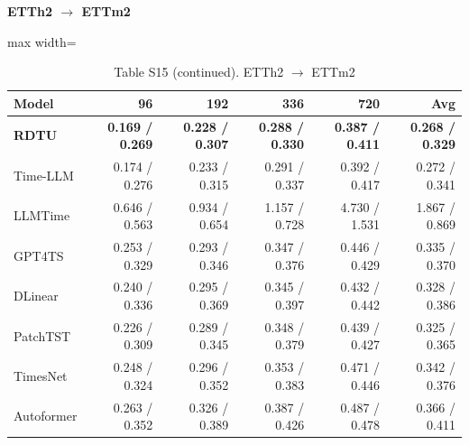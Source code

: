\begin{table}[H]\centering\small
\caption*{Table S15 (continued). ETTh2 $\to$ ETTm2}
\textbf{ETTh2 $\to$ ETTm2}\par\smallskip
\begin{adjustbox}{max width=\linewidth}\begin{tabular}{lrrrrr}\toprule
\textbf{Model} & \textbf{96} & \textbf{192} & \textbf{336} & \textbf{720} & \textbf{Avg}\\\midrule
\rowcolor{blue!5}
\textbf{RDTU} & \textbf{0.169 / 0.269} & \textbf{0.228 / 0.307} & \textbf{0.288 / 0.330} & \textbf{0.387 / 0.411} & \textbf{0.268 / 0.329}\\
Time-LLM & 0.174 / 0.276 & 0.233 / 0.315 & 0.291 / 0.337 & 0.392 / 0.417 & 0.272 / 0.341\\
LLMTime & 0.646 / 0.563 & 0.934 / 0.654 & 1.157 / 0.728 & 4.730 / 1.531 & 1.867 / 0.869\\
GPT4TS & 0.253 / 0.329 & 0.293 / 0.346 & 0.347 / 0.376 & 0.446 / 0.429 & 0.335 / 0.370\\
DLinear & 0.240 / 0.336 & 0.295 / 0.369 & 0.345 / 0.397 & 0.432 / 0.442 & 0.328 / 0.386\\
PatchTST & 0.226 / 0.309 & 0.289 / 0.345 & 0.348 / 0.379 & 0.439 / 0.427 & 0.325 / 0.365\\
TimesNet & 0.248 / 0.324 & 0.296 / 0.352 & 0.353 / 0.383 & 0.471 / 0.446 & 0.342 / 0.376\\
Autoformer & 0.263 / 0.352 & 0.326 / 0.389 & 0.387 / 0.426 & 0.487 / 0.478 & 0.366 / 0.411\\
\bottomrule\end{tabular}\end{adjustbox}\end{table}
